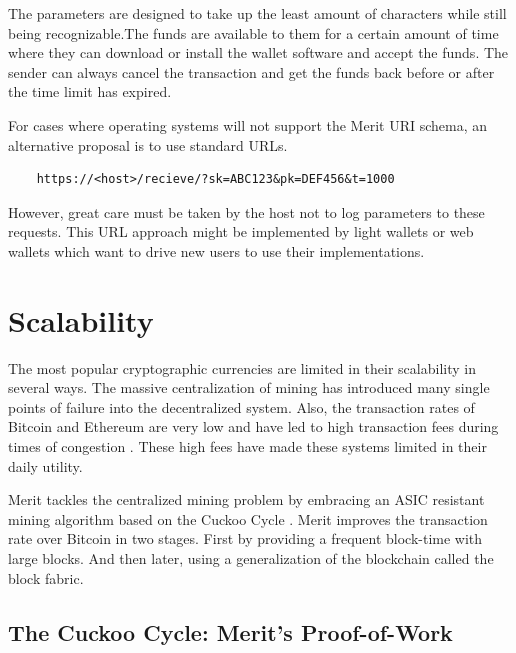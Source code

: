 \documentclass{article}
\begin{document}
   
The parameters are designed to take up the least amount of characters while
still being recognizable.The funds are available to them for a certain amount of
time where they can download or install the wallet software and accept the funds.
The sender can always cancel the transaction and get the funds back before or
after the time limit has expired.

For cases where operating systems will not support the Merit URI schema, an
alternative proposal is to use standard URLs.

\begin{verbatim}
    https://<host>/recieve/?sk=ABC123&pk=DEF456&t=1000
\end{verbatim}

However, great care must be taken by the host not to log parameters to these
requests. This URL approach might be implemented by light wallets or web wallets
which want to drive new users to use their implementations.

\section{Scalability}

The most popular cryptographic currencies are limited in their scalability
in several ways. The massive centralization of mining has introduced many single
points of failure into the decentralized system. Also, the transaction
rates of Bitcoin and Ethereum are very low and have led to high transaction fees
during times of congestion \cite{fees}. These high fees have made these systems limited
in their daily utility.

Merit tackles the centralized mining problem by embracing an ASIC resistant
mining algorithm based on the Cuckoo Cycle \cite{cuckoo}. Merit improves the
transaction rate over Bitcoin in two stages. First by providing a frequent block-time with large blocks. And then later, using a generalization of the blockchain
called the \gls{block fabric}.

\subsection{The Cuckoo Cycle: Merit's Proof-of-Work}
\end{document}
